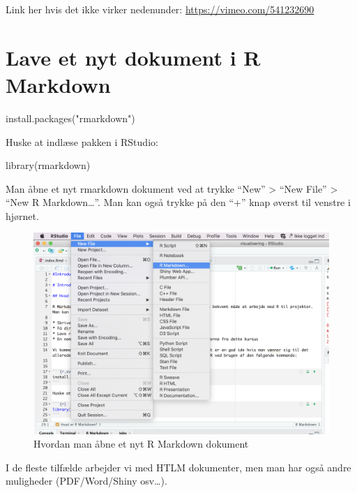 \documentclass[
]{book}
\newenvironment{Shaded}{\begin{snugshade}}{\end{snugshade}}
\newcommand{\FunctionTok}[1]{\textcolor[rgb]{0.00,0.00,0.00}{#1}}
\newcommand{\NormalTok}[1]{#1}
\newcommand{\StringTok}[1]{\textcolor[rgb]{0.31,0.60,0.02}{#1}}
\begin{document}
Link her hvis det ikke virker nedenunder: \url{https://vimeo.com/541232690}

\hypertarget{lave-et-nyt-dokument-i-r-markdown}{%
\section{Lave et nyt dokument i R Markdown}\label{lave-et-nyt-dokument-i-r-markdown}}

\begin{Shaded}
\begin{Highlighting}[]
\FunctionTok{install.packages}\NormalTok{(}\StringTok{"rmarkdown"}\NormalTok{)}
\end{Highlighting}
\end{Shaded}

Huske at indlæse pakken i RStudio:

\begin{Shaded}
\begin{Highlighting}[]
\FunctionTok{library}\NormalTok{(rmarkdown)}
\end{Highlighting}
\end{Shaded}

Man åbne et nyt rmarkdown dokument ved at trykke ``New'' \textgreater{} ``New File'' \textgreater{} ``New R Markdown\ldots{}''. Man kan også trykke på den ``+'' knap øverst til venstre i hjørnet.

\begin{figure}
\centering
\includegraphics{plots/open_new_rmarkdown.png}
\caption{Hvordan man åbne et nyt R Markdown dokument}
\end{figure}

I de fleste tilfælde arbejder vi med HTLM dokumenter, men man har også andre muligheder (PDF/Word/Shiny osv\ldots).
\end{document}
